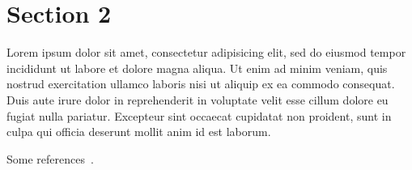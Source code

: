 \documentclass[a4paper, 12pt, twoside, dvipsnames]{article}
\begin{document}
\section{Section 2}
Lorem ipsum dolor sit amet, consectetur adipisicing elit, sed do eiusmod
tempor incididunt ut labore et dolore magna aliqua. Ut enim ad minim veniam,
quis nostrud exercitation ullamco laboris nisi ut aliquip ex ea commodo
consequat. Duis aute irure dolor in reprehenderit in voluptate velit esse
cillum dolore eu fugiat nulla pariatur. Excepteur sint occaecat cupidatat non
proident, sunt in culpa qui officia deserunt mollit anim id est laborum.

Some references~\cite{SMAD, Brown}.


\printbibliography

\label{Lastpage}
\end{document}

